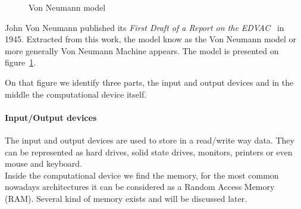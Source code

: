 \begin{figure}
\centering 
{}
\caption{Von Neumann model}
\label{fig:1_HPC:von_neumann_model}
\end{figure}

John Von Neumann published its \textit{First Draft of a Report on the EDVAC}~\cite{von1993first} in 1945. 
Extracted from this work, the model know as the Von Neumann model or more generally Von Neumann Machine appears. 
The model is presented on figure~\ref{fig:1_HPC:von_neumann_model}.

On that figure we identify three parts, the input and output devices and in the middle the computational device itself. 
\paragraph{Input/Output devices}
The input and output devices are used to store in a read/write way data. 
They can be represented as hard drives, solid state drives, monitors, printers or even mouse and keyboard.\\

Inside the computational device we find the memory, for the most common nowadays architectures it can be considered as a Random Access Memory (RAM). 
Several kind of memory exists and will be discussed later. 

